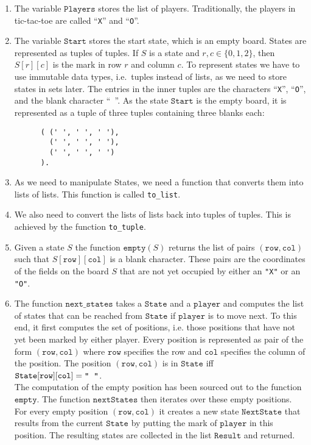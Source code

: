 \begin{enumerate}
\item The variable $\texttt{Players}$ stores the list of players.  Traditionally, the players in
      tic-tac-toe are called ``\texttt{X}'' and ``\texttt{O}''.  
\item The variable $\texttt{Start}$ stores the start state, which is an empty board.
      States are represented as tuples of tuples.  If $S$ is a state and $r,c \in \{0,1,2\}$,
      then $S[r][c]$ is the mark in row $r$ and column $c$.
      To represent states we have to use immutable data types, i.e.~tuples instead of lists, as we need to
      store states in sets later.  The entries in the inner tuples are the characters 
      ``\texttt{X}'', ``\texttt{O}'', and the blank character ``\texttt{ }''.
      As the state  $\texttt{Start}$ is the empty board, it is represented as a tuple of three tuples
      containing three blanks each:
      \begin{Verbatim}
      ( (' ', ' ', ' '), 
        (' ', ' ', ' '), 
        (' ', ' ', ' ')
      ).     
      \end{Verbatim}
\item As we need to manipulate States, we need a function that converts them into lists of lists.
      This function is called \texttt{to\_list}.
\item We also need to convert the lists of lists back into tuples of tuples.  This is achieved by the function
      \texttt{to\_tuple}.
\item Given a state $S$ the function $\mathtt{empty}(S)$ returns the list of pairs 
      $(\mathtt{row}, \mathtt{col})$ such that $S[\mathtt{row}][\mathtt{col}]$ is a blank character.  These pairs are
      the coordinates of the fields on the board $S$ that are not yet occupied by either an \texttt{"X"} or an
      \texttt{"O"}.   
\item The function $\texttt{next\_states}$ takes a $\texttt{State}$ and a $\texttt{player}$ and computes the list
      of states that can be reached from $\texttt{State}$ if $\texttt{player}$ is to move next.
      To this end, it first computes the set of  positions, i.e. those positions that have not yet
      been marked by either player. Every position is represented as pair of the
      form $(\texttt{row}, \texttt{col})$ where $\texttt{row}$ specifies the row and $\texttt{col}$ specifies
      the column of the position.  The position $(\texttt{row}, \texttt{col})$ is  in
      $\texttt{State}$ iff
      \\[0.2cm]
      \hspace*{1.3cm}
      $\texttt{State}[\texttt{row}][\texttt{col}] = \texttt{\symbol{34}\;\;\symbol{34}}$.
      \\[0.2cm]
      The computation of the empty position has been sourced out to the function $\texttt{empty}$.
      The function $\texttt{nextStates}$ then iterates over these empty positions. For every 
      empty position $(\texttt{row}, \texttt{col})$ it creates a new state $\texttt{NextState}$ that results
      from the current $\texttt{State}$ by putting the mark of $\texttt{player}$ in this position.  
      The resulting states are collected in the list $\texttt{Result}$ and returned.


\end{enumerate}
